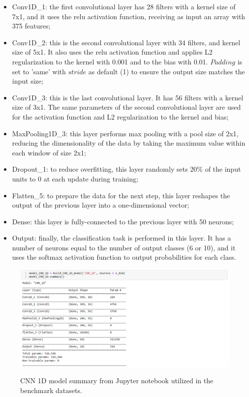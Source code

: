 \begin{itemize}
    \item Conv1D\_1: the first convolutional layer has 28 filters with a kernel size of 7x1, and it uses the \gls{relu} activation function, receiving as input an array with 375 features;
    \item Conv1D\_2: this is the second convolutional layer with 34 filters, and kernel size of 5x1. It also uses the \gls{relu} activation function and applies L2 regularization to the kernel with 0.001 and to the bias with 0.01. $Padding$ is set to 'same' with $stride$ as default (1) to ensure the output size matches the input size;
    \item Conv1D\_3: this is the last convolutional layer. It has 56 filters with a kernel size of 3x1. The same parameters of the second convolutional layer are used for the activation function and L2 regularization to the kernel and bias;
    \item MaxPooling1D\_3: this layer performs max pooling with a pool size of 2x1, reducing the dimensionality of the data by taking the maximum value within each window of size 2x1;
    \item Dropout\_1: to reduce overfitting, this layer randomly sets 20\% of the input units to 0 at each update during training; 
    \item Flatten\_5: to prepare the data for the next step, this layer reshapes the output of the previous layer into a one-dimensional vector;
    \item Dense: this layer is fully-connected to the previous layer with 50 neurons; 
    \item Output: finally, the classification task is performed in this layer. It has a number of neurons equal to the number of output classes (6 or 10), and it uses the softmax activation function to output probabilities for each class.
\end{itemize}

\begin{figure}[htbp]
    \raggedright
        \caption{CNN 1D model summary from Jupyter notebook utilized in the benchmark datasets.}
        \includegraphics[width=1\textwidth]{resources/images/050-methods/Methods_training_CNN1D_architecture_jupyter_notebook.png}
        \label{fig:methods_training_CNN_1D_architecture_jupyter_notebook}
\end{figure} 

